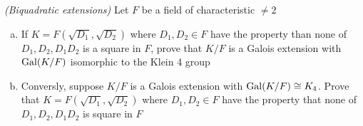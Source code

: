 \begin{exercise}
    \textit{(Biquadratic extensions)} Let $F$ be a field of characteristic $\neq 2$
    \begin{enumerate}[(a)]
        \item If $K = F(\sqrt{D_1}, \sqrt{D_2})$ where $D_1, D_2 \in F$ have the property than none of $D_1, D_2, D_1D_2$ is a square in $F$, prove that $K/F$ is a Galois extension with $\operatorname{Gal}(K/F)$ isomorphic to the Klein 4 group

        \item Conversly, suppose $K/F$ is a Galois extension with $\operatorname{Gal}(K/F) \cong K_4$. Prove that $K = F(\sqrt{D_1}, \sqrt{D_2})$ where $D_1, D_2 \in F$ have the property that none of $D_1, D_2, D_1D_2$ is square in $F$
    \end{enumerate}
\end{exercise}
